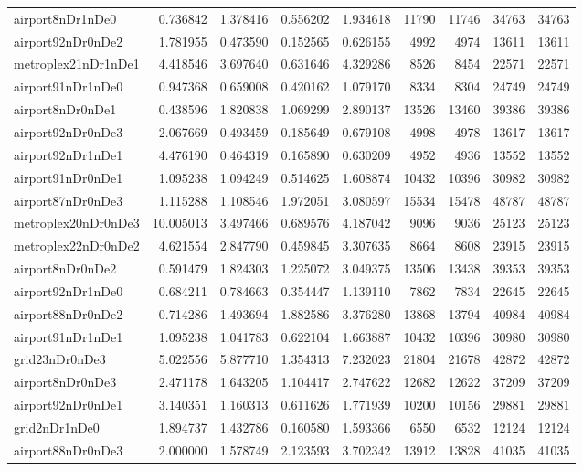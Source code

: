\begin{longtable}{|l|r|r|r|r|r|r|r|r|}
airport8nDr1nDe0 & 0.736842 & 1.378416 & 0.556202 & 1.934618 & 11790 & 11746 & 34763 & 34763 \\
airport92nDr0nDe2 & 1.781955 & 0.473590 & 0.152565 & 0.626155 & 4992 & 4974 & 13611 & 13611 \\
metroplex21nDr1nDe1 & 4.418546 & 3.697640 & 0.631646 & 4.329286 & 8526 & 8454 & 22571 & 22571 \\
airport91nDr1nDe0 & 0.947368 & 0.659008 & 0.420162 & 1.079170 & 8334 & 8304 & 24749 & 24749 \\
airport8nDr0nDe1 & 0.438596 & 1.820838 & 1.069299 & 2.890137 & 13526 & 13460 & 39386 & 39386 \\
airport92nDr0nDe3 & 2.067669 & 0.493459 & 0.185649 & 0.679108 & 4998 & 4978 & 13617 & 13617 \\
airport92nDr1nDe1 & 4.476190 & 0.464319 & 0.165890 & 0.630209 & 4952 & 4936 & 13552 & 13552 \\
airport91nDr0nDe1 & 1.095238 & 1.094249 & 0.514625 & 1.608874 & 10432 & 10396 & 30982 & 30982 \\
airport87nDr0nDe3 & 1.115288 & 1.108546 & 1.972051 & 3.080597 & 15534 & 15478 & 48787 & 48787 \\
metroplex20nDr0nDe3 & 10.005013 & 3.497466 & 0.689576 & 4.187042 & 9096 & 9036 & 25123 & 25123 \\
metroplex22nDr0nDe2 & 4.621554 & 2.847790 & 0.459845 & 3.307635 & 8664 & 8608 & 23915 & 23915 \\
airport8nDr0nDe2 & 0.591479 & 1.824303 & 1.225072 & 3.049375 & 13506 & 13438 & 39353 & 39353 \\
airport92nDr1nDe0 & 0.684211 & 0.784663 & 0.354447 & 1.139110 & 7862 & 7834 & 22645 & 22645 \\
airport88nDr0nDe2 & 0.714286 & 1.493694 & 1.882586 & 3.376280 & 13868 & 13794 & 40984 & 40984 \\
airport91nDr1nDe1 & 1.095238 & 1.041783 & 0.622104 & 1.663887 & 10432 & 10396 & 30980 & 30980 \\
grid23nDr0nDe3 & 5.022556 & 5.877710 & 1.354313 & 7.232023 & 21804 & 21678 & 42872 & 42872 \\
airport8nDr0nDe3 & 2.471178 & 1.643205 & 1.104417 & 2.747622 & 12682 & 12622 & 37209 & 37209 \\
airport92nDr0nDe1 & 3.140351 & 1.160313 & 0.611626 & 1.771939 & 10200 & 10156 & 29881 & 29881 \\
grid2nDr1nDe0 & 1.894737 & 1.432786 & 0.160580 & 1.593366 & 6550 & 6532 & 12124 & 12124 \\
airport88nDr0nDe3 & 2.000000 & 1.578749 & 2.123593 & 3.702342 & 13912 & 13828 & 41035 & 41035 \\

\end{longtable}
